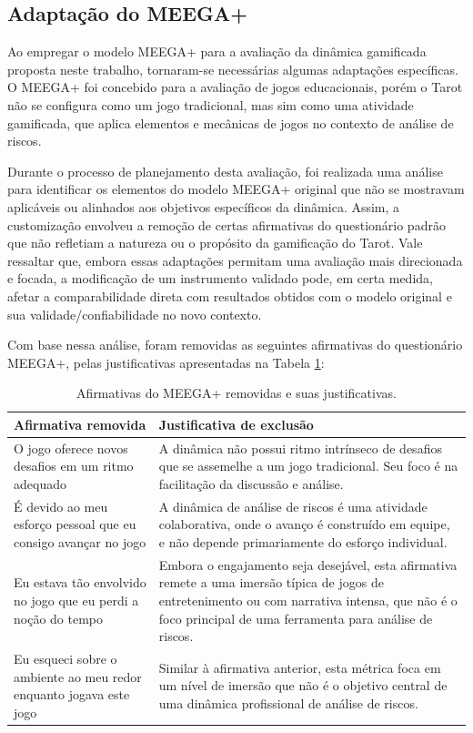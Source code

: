\documentclass[
	12pt,
	openright,
	twoside,
	a4paper,
	english,
	brazil
	]{abntex2}
\begin{document}
\subsection{Adaptação do MEEGA+}

Ao empregar o modelo MEEGA+ para a avaliação da dinâmica gamificada proposta neste trabalho, tornaram-se necessárias algumas adaptações específicas. O MEEGA+ foi concebido para a avaliação de jogos educacionais, porém o Tarot não se configura como um jogo tradicional, mas sim como uma atividade gamificada, que aplica elementos e mecânicas de jogos no contexto de análise de riscos.

Durante o processo de planejamento desta avaliação, foi realizada uma análise para identificar os elementos do modelo MEEGA+ original que não se mostravam aplicáveis ou alinhados aos objetivos específicos da dinâmica. Assim, a customização envolveu a remoção de certas afirmativas do questionário padrão que não refletiam a natureza ou o propósito da gamificação do Tarot. Vale ressaltar que, embora essas adaptações permitam uma avaliação mais direcionada e focada, a modificação de um instrumento validado pode, em certa medida, afetar a comparabilidade direta com resultados obtidos com o modelo original e sua validade/confiabilidade no novo contexto.

Com base nessa análise, foram removidas as seguintes afirmativas do questionário MEEGA+, pelas justificativas apresentadas na Tabela \ref{tab:afirmativas-removidas}:

\begin{table}[h!]
  \centering
  \caption{Afirmativas do MEEGA+ removidas e suas justificativas.}
  \label{tab:afirmativas-removidas}
  \begin{tabular}{|p{}|p{}|}
  \hline
  \textbf{Afirmativa removida} & \textbf{Justificativa de exclusão} \\ \hline
  O jogo oferece novos desafios em um ritmo adequado & A dinâmica não possui ritmo intrínseco de desafios que se assemelhe a um jogo tradicional. Seu foco é na facilitação da discussão e análise. \\ \hline
  É devido ao meu esforço pessoal que eu consigo avançar no jogo & A dinâmica de análise de riscos é uma atividade colaborativa, onde o avanço é construído em equipe, e não depende primariamente do esforço individual. \\ \hline
  Eu estava tão envolvido no jogo que eu perdi a noção do tempo & Embora o engajamento seja desejável, esta afirmativa remete a uma imersão típica de jogos de entretenimento ou com narrativa intensa, que não é o foco principal de uma ferramenta para análise de riscos. \\ \hline
  Eu esqueci sobre o ambiente ao meu redor enquanto jogava este jogo & Similar à afirmativa anterior, esta métrica foca em um nível de imersão que não é o objetivo central de uma dinâmica profissional de análise de riscos. \\ \hline
  \end{tabular}
\end{table}
\end{document}
